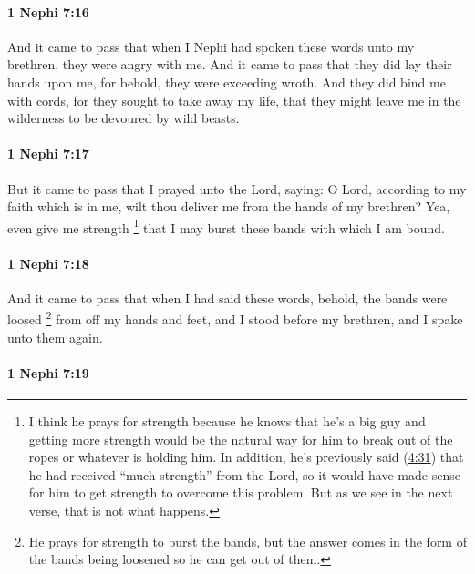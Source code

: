 		\paragraph{1 Nephi 7:16} %
			\label{1NEPHI-7-16}

			And it came to pass that when I Nephi had spoken these words unto my brethren,
			they were angry with me.
			And it came to pass that they did lay their hands upon me,
			for behold, they were exceeding wroth.
			And they did bind me with cords,
			for they sought to take away my life,
			that they might leave me in the wilderness to be devoured by wild beasts.

		\paragraph{1 Nephi 7:17} %
			\label{1NEPHI-7-17}

			But it came to pass that I prayed unto the Lord, saying:
			O Lord, according to my faith which is in me,
			wilt thou deliver me from the hands of my brethren?
			Yea, even give me strength%
				\footnote{%
					I think he prays for strength because he knows that he's a big guy and getting more strength would be the natural way for him to break out of the ropes or whatever is holding him. In addition, he's previously said (\hyperref[1NEPHI-4-31]{4:31}) that he had received ``much strength'' from the Lord, so it would have made sense for him to get strength to overcome this problem. But as we see in the next verse, that is not what happens.
					}
			that I may burst these bands with which I am bound.

		\paragraph{1 Nephi 7:18} %
			\label{1NEPHI-7-18}

			And it came to pass that when I had said these words,
			behold, the bands were loosed%
				\footnote{%
					\label{1NEPHI-7-18-NOTE-loosed}%
					He prays for strength to burst the bands, but the answer comes in the form of the bands being loosened so he can get out of them.
					}
			from off my hands and feet,
			and I stood before my brethren, and I spake unto them again.

		\paragraph{1 Nephi 7:19} %
			\label{1NEPHI-7-19}

